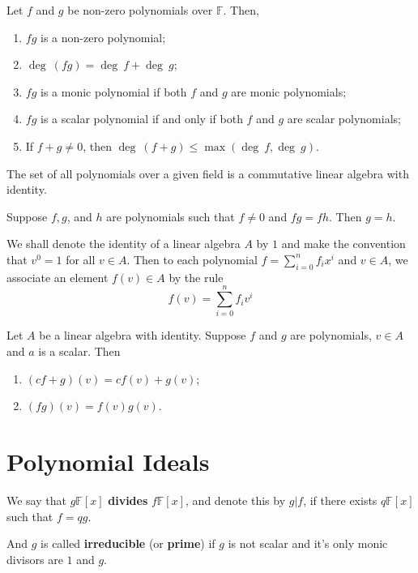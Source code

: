\begin{theorem}
	Let $f$ and $g$ be non-zero polynomials over $\mathbb{F}$. Then,
	\begin{enumerate}
		\item $fg$ is a non-zero polynomial;
		\item $\deg ~(fg) = \deg ~f + \deg ~g$;
		\item $fg$ is a monic polynomial if both $f$ and $g$ are monic polynomials;
		\item $fg$ is a scalar polynomial if and only if both $f$ and $g$ are scalar polynomials;
		\item If $f + g \neq 0$, then $\deg ~(f+g) \leq \max (\deg ~f, \deg ~g)$.
	\end{enumerate}
\end{theorem}

\begin{corollary}
	The set of all polynomials over a given field is a commutative linear algebra with identity.
\end{corollary}

\begin{corollary}
	Suppose $f, g$, and $h$ are polynomials such that $f \neq 0$ and $fg = fh$. Then $g=h$.
\end{corollary}

\begin{definition}
	We shall denote the identity of a linear algebra $A$ by $1$ and make the convention that $v^0 = 1$ for all $v \in A$. Then to each polynomial $f = \sum_{i=0}^n f_i x^i$ and $v \in A$, we associate an element $f(v) \in A$ by the rule
	\[
		f(v) = \sum_{i=0}^n f_i v^i
	\]
\end{definition}

\begin{theorem}
	Let $A$ be a linear algebra with identity. Suppose $f$ and $g$ are polynomials, $v \in A$ and $a$ is a scalar. Then
	\begin{enumerate}
		\item $(cf+g)(v) = cf(v) + g(v)$;
		\item $(fg)(v) = f(v)g(v)$.
	\end{enumerate}
\end{theorem}

\section{Polynomial Ideals}

\begin{definition}
	We say that $g \mathbb{F}[x]$ \textbf{divides} $f \mathbb{F}[x]$, and denote this by $g | f$, if there exists $q \mathbb{F}[x]$ such that $f = qg$. 
	
	And $g$ is called \textbf{irreducible} (or \textbf{prime}) if $g$ is not scalar and it's only monic divisors are $1$ and $g$.
\end{definition}

